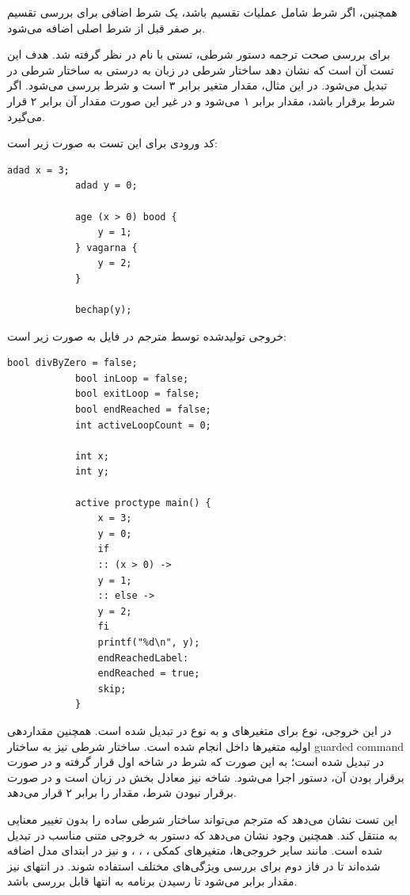 \documentclass[12pt]{report}
\begin{document}
	همچنین، اگر شرط شامل عملیات تقسیم باشد، یک شرط اضافی برای بررسی تقسیم بر صفر قبل از شرط اصلی اضافه می‌شود.
	
	\noindent
	برای بررسی صحت ترجمه دستور شرطی، تستی با نام  در نظر گرفته شد.
	هدف این تست آن است که نشان دهد ساختار شرطی  در زبان  به درستی به ساختار شرطی  در  تبدیل می‌شود.
	در این مثال، مقدار متغیر  برابر ۳ است و شرط  بررسی می‌شود.
	اگر شرط برقرار باشد، مقدار  برابر ۱ می‌شود و در غیر این صورت مقدار آن برابر ۲ قرار می‌گیرد.
	
	کد ورودی  برای این تست به صورت زیر است:
	
	\begin{latin}
		\begin{lstlisting}[style=hashstyle]
			adad x = 3;
			adad y = 0;
			
			age (x > 0) bood {
				y = 1;
			} vagarna {
				y = 2;
			}
			
			bechap(y);
		\end{lstlisting}
	\end{latin}
	
	خروجی تولیدشده توسط مترجم در فایل  به صورت زیر است:
	
	\begin{latin}
		\begin{lstlisting}[style=codestyle]
			bool divByZero = false;
			bool inLoop = false;
			bool exitLoop = false;
			bool endReached = false;
			int activeLoopCount = 0;
			
			int x;
			int y;
			
			active proctype main() {
				x = 3;
				y = 0;
				if
				:: (x > 0) ->
				y = 1;
				:: else ->
				y = 2;
				fi
				printf("%d\n", y);
				endReachedLabel:
				endReached = true;
				skip;
			}
		\end{lstlisting}
	\end{latin}
	
	در این خروجی، نوع  برای متغیرهای  و  به نوع  در  تبدیل شده است.
	همچنین مقداردهی اولیه متغیرها داخل  انجام شده است.
	ساختار شرطی  نیز به ساختار guarded command در  تبدیل شده است؛ به این صورت که شرط  در شاخه اول قرار گرفته و در صورت برقرار بودن آن، دستور  اجرا می‌شود.
	شاخه  نیز معادل بخش  در زبان  است و در صورت برقرار نبودن شرط، مقدار  را برابر ۲ قرار می‌دهد.
	
	این تست نشان می‌دهد که مترجم می‌تواند ساختار شرطی ساده را بدون تغییر معنایی به  منتقل کند.
	همچنین وجود  نشان می‌دهد که دستور  به خروجی متنی مناسب در  تبدیل شده است.
	مانند سایر خروجی‌ها، متغیرهای کمکی ، ، ،  و  نیز در ابتدای مدل اضافه شده‌اند تا در فاز دوم برای بررسی ویژگی‌های مختلف استفاده شوند.
	در انتهای  نیز مقدار  برابر  می‌شود تا رسیدن برنامه به انتها قابل بررسی باشد.
	
\end{document}
